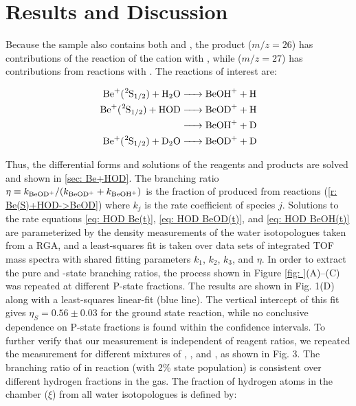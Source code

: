 \section{Results and Discussion}

Because the  sample also contains both  and , the product  ($m/z = 26$) has contributions of the reaction of the cation with , while  ($m/z = 27$) has contributions from reactions with . The reactions of interest are:

\begin{align}
	\ce{Be+(^2S1/2) + H2O & -> BeOH+ + H} \nonumber \\
	\ce{Be+(^2S1/2) + HOD & -> BeOD+ + H} \label{r: Be(S)+HOD->BeOD} \\
	\ce{& -> BeOH+ + D} \label{r: Be(S)+HOD->BeOH} \\
	\ce{Be+(^2S1/2) + D2O & -> BeOD+ + D} \label{r: Be(S)+D2O->BeOD}
\end{align}

Thus, the differential forms and solutions of the reagents and products are solved and shown in \ref{sec: Be+HOD}. The branching ratio $\eta \equiv k_{\ce{BeOD+}}/(k_{\ce{BeOD+}} + k_{\ce{BeOH+}})$ is the fraction of  produced from reactions (\ref{r: Be(S)+HOD->BeOD}) where $k_j$ is the rate coefficient of species $j$. Solutions to the rate equations \ref{eq: HOD Be(t)}, \ref{eq: HOD BeOD(t)}, and \ref{eq: HOD BeOH(t)} are parameterized by the density measurements of the water isotopologues taken from a RGA, and a least-squares fit is taken over data sets of integrated TOF mass spectra with shared fitting parameters $k_1$, $k_2$, $k_3$, and $\eta$. In order to extract the pure  and -state branching ratios, the process shown in Figure \ref{fig: }(A)–(C) was repeated at different P-state fractions. The results are shown in Fig. 1(D) along with a least-squares linear-fit (blue line). The vertical intercept of this fit gives $\eta_S = 0.56 \pm 0.03$ for the ground  state reaction, while no conclusive dependence on P-state fractions is found within the confidence intervals. To further verify that our measurement is independent of reagent ratios, we repeated the measurement for different mixtures of , , and , as shown in Fig. 3. The branching ratio of  in reaction  (with 2\%  state population) is consistent over different hydrogen fractions in the gas. The fraction of hydrogen atoms in the chamber ($\xi$) from all water isotopologues is defined by:

